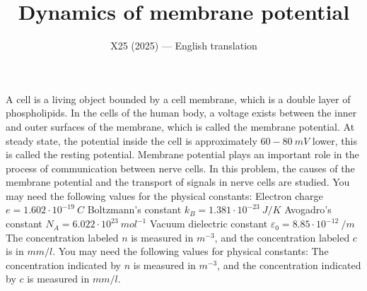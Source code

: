 \documentclass[11pt,a4paper]{article}
\title{\textbf{Dynamics of membrane potential}}
\author{\normalsize X25 (2025) — English translation}
\date{}
\begin{document}
\maketitle
A cell is a living object bounded by a cell membrane, which is a double layer of phospholipids. In the cells of the human body, a voltage exists between the inner and outer surfaces of the membrane, which is called the membrane potential. At steady state, the potential inside the cell is approximately $60-80~mV$ lower, this is called the resting potential. Membrane potential plays an important role in the process of communication between nerve cells. In this problem, the causes of the membrane potential and the transport of signals in nerve cells are studied. You may need the following values for the physical constants: Electron charge $e=1.602\cdot10^{-19}~C$ Boltzmann's constant $k_B=1.381\cdot10^{-23}~J/K$ Avogadro's constant $N_A=6.022\cdot10^{23}~mol^{-1}$ Vacuum dielectric constant $\varepsilon_0=8.85\cdot10^{-12}~/m$ The concentration labeled $n$ is measured in $m^{-3}$, and the concentration labeled $c$ is in $mm/l$.
You may need the following values for physical constants:
The concentration indicated by $n$ is measured in $m^{-3}$, and the concentration indicated by $c$ is measured in $mm/l$.
\end{document}
